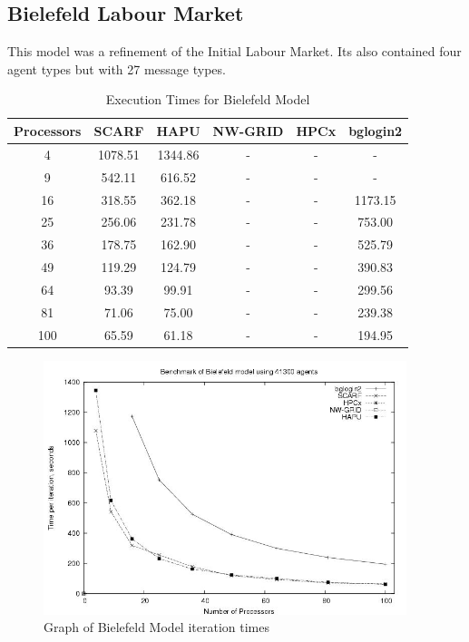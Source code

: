 \subsection{Bielefeld Labour Market}
This model was a refinement of the Initial Labour Market. Its also contained four agent types but with 27 message types.
{
\renewcommand{\arraystretch}{1.25}
\begin{table}[ht]
 \centering
  \begin{tabular}{c|ccccc}
 Processors &SCARF &HAPU  &NW-GRID &HPCx   &bglogin2 \\ \hline
4 &1078.51 &1344.86 &- &- &-    \\
9 &542.11 &616.52 &- &- &-      \\
16 &318.55 &362.18 &- &- &1173.15       \\
25 &256.06 &231.78 &- &- &753.00        \\
36 &178.75 &162.90 &- &- &525.79        \\
49 &119.29 &124.79 &- &- &390.83        \\
64 &93.39 &99.91 &- &- &299.56  \\
81 &71.06 &75.00 &- &- &239.38  \\
100 &65.59 &61.18 &- &- &194.95 \\
 \end{tabular}
 \caption{Execution Times for Bielefeld Model}
 \label{tab:ExecutionTimesForBielefeld}
\end{table}
}
\bigskip
\begin{figure}[ht]
 \centering
  \includegraphics[width=300pt]{Bielefeld2-graph.jpg}
 \caption{Graph of Bielefeld Model iteration times}
 \label{fig:Labour-graph2}
\end{figure}


